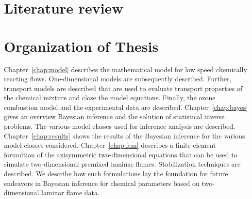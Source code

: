 \section{Literature review}



\section{Organization of Thesis}
\bigskip
\noindent
Chapter~\ref{chap:model} describes the mathematical model for low speed
chemically reacting flows. One-dimensional models are subsequently described.
Further, transport models are described that are used to evaluate
transport properties of the chemical mixture and close the model equations.
Finally, the ozone combustion model and the experimental data are
described.
Chapter~\ref{chap:bayes} gives an overview
Bayesian inference and the solution of statistical inverse problems.
The various model classes used for inference
analysis are described.
Chapter~\ref{chap:results} shows the results of the Bayesian inference
for the various model classes considered.
Chapter~\ref{chap:fem} describes a finite element formultion of the
axisymmetric two-dimensional equations that can be used to simulate
two-dimensional premixed laminar flames. Stabilization techniques are
described. We describe how such formulations lay the foundation for future
endeavors in Bayesian inference for chemical parameters based on
two-dimensional laminar flame data.
